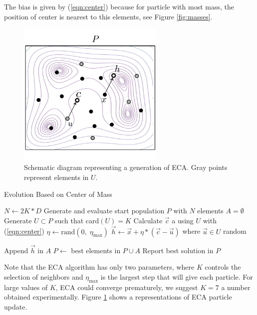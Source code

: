 \documentclass[graybox]{svmult}
\begin{document}
\begin{note}
The bias is given by (\ref{eqn:center}) because for particle with most mass, the position of center is nearest to this elements, see Figure \ref{fig:masses}.
\end{note}

\begin{figure}[!ht]
	\sidecaption
	\includegraphics[width=7cm]{img/ecaG.pdf}
	\caption{Schematic diagram representing a generation of ECA. Gray points represent elements in $U$.}
	\label{fig:ecag}       %
\end{figure}

\begin{algorithm}[!ht]
	\caption{Evolution Based on Center of Mass}
	\label{algoritmoEca}
	\begin{algorithmic}[1]
		\State $N \gets 2K * D$
		\State Generate and evaluate start population $P$ with $N$ elements
			\State $A = \emptyset$
				\State Generate $U \subset P$ such that  card$(U) = K$
				\State Calculate $\vec{c}$ a using $U$ with (\ref{eqn:center})
				\State $\eta \gets \text{rand}(0,\; \eta_{\max}) $ 
				\State $\vec{h} \gets \vec{x} + \eta  * (\vec{c} - \vec{u}) $ where $ \vec{u} \in U $ random
				
					\State Append $\vec{h} $ in $A$
				\EndIf
			\EndFor
			\State $P \gets $ best elements in $P \cup A$
		\EndWhile
		\State Report best solution in $P$
		\EndProcedure
	\end{algorithmic}
\end{algorithm}

Note that the ECA algorithm has only two parameters, where $K$ controls the selection of neighbors and $\eta_{\max}$ is the largest step that will give each particle. For large values of $K$, ECA could converge prematurely, we suggest $K = 7$ a number obtained experimentally. Figure \ref{fig:ecag} shows a representations of ECA particle update. 
\end{document}
